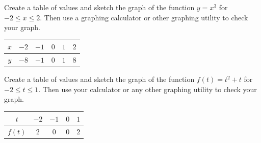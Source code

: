 
\begin{exercise}
Create a table of values and sketch the graph of the function $y=x^3$ for $-2\leq x\leq 2$. Then use a graphing calculator or other graphing utility to check your graph.
\end{exercise}

\begin{solution}

\begin{minipage}{0.5\textwidth}
\begin{tabular}{|c|c|c|c|c|c|} \hline
$x$ & $-2$ & $-1$ & $0$ & $1$ & $2$ \\ \hline
$y$ & $-8$ & $-1$ & $0$ & $1$ & $8$ \\\hline
\end{tabular}
\end{minipage}
\begin{minipage}{0.5\textwidth}
\end{minipage}
\end{solution}





\begin{exercise}
Create a table of values and sketch the graph of the function $f(t)=t^2+t$ for $-2\leq t\leq 1$. Then use your calculator or any other graphing utility to check your graph.
\end{exercise}


\begin{solution}

\begin{minipage}{0.5\textwidth}
\begin{tabular}{|c|c|c|c|c|} \hline
$t$ & $-2$ & $-1$ & $0$ & $1$  \\ \hline
$f(t)$ & $2$ & $0$ & $0$ & $2$ \\\hline
\end{tabular}
\end{minipage}
\begin{minipage}{0.5\textwidth}
\end{minipage}
\end{solution}








